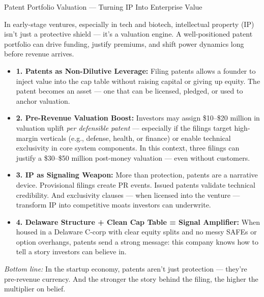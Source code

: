 \begin{TechnicalSidebar}{Patent Portfolio Valuation — Turning IP Into Enterprise Value}

  In early-stage ventures, especially in tech and biotech, intellectual property (IP) isn’t just a protective shield — 
  it’s a valuation engine. A well-positioned patent portfolio can drive funding, justify premiums, and shift power dynamics 
  long before revenue arrives.
  
  \medskip

  \begin{itemize}
  
    \item \textbf{1. Patents as Non-Dilutive Leverage:}  
    Filing patents allows a founder to inject value into the cap table without raising capital or giving up equity. The patent 
    becomes an asset — one that can be licensed, pledged, or used to anchor valuation.
    
    \item \textbf{2. Pre-Revenue Valuation Boost:}  
    Investors may assign \$10–\$20 million in valuation uplift \textit{per defensible patent} — especially if the filings 
    target high-margin verticals (e.g., defense, health, or finance) or enable technical exclusivity in core system components. 
    In this context, three filings can justify a \$30–\$50 million post-money valuation — even without customers.
    
    \item \textbf{3. IP as Signaling Weapon:}  
    More than protection, patents are a narrative device. Provisional filings create PR events. Issued patents validate technical 
    credibility. And exclusivity clauses — when licensed into the venture — transform IP into competitive moats investors can 
    underwrite.
    
    \item \textbf{4. Delaware Structure + Clean Cap Table = Signal Amplifier:}  
    When housed in a Delaware C-corp with clear equity splits and no messy SAFEs or option overhangs, patents send a strong 
    message: this company knows how to tell a story investors can believe in.

  \end{itemize}

  \medskip
  
  \textit{Bottom line:}  
  In the startup economy, patents aren’t just protection — they’re pre-revenue currency.  
  And the stronger the story behind the filing, the higher the multiplier on belief.
  
\end{TechnicalSidebar}






